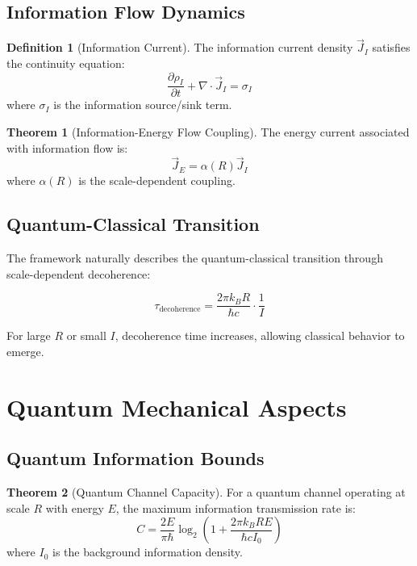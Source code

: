 \documentclass[11pt,a4paper]{article}
\theoremstyle{definition}
\newtheorem{definition}{Definition}[section]
\newtheorem{theorem}{Theorem}[section]
\begin{document}
\subsection{Information Flow Dynamics}

\begin{definition}[Information Current]
The information current density $\vec{J}_I$ satisfies the continuity equation:
\begin{equation}
\frac{\partial \rho_I}{\partial t} + \nabla \cdot \vec{J}_I = \sigma_I
\end{equation}
where $\sigma_I$ is the information source/sink term.
\end{definition}

\begin{theorem}[Information-Energy Flow Coupling]
The energy current associated with information flow is:
\begin{equation}
\vec{J}_E = \alpha(R) \vec{J}_I
\end{equation}
where $\alpha(R)$ is the scale-dependent coupling.
\end{theorem}

\subsection{Quantum-Classical Transition}

The framework naturally describes the quantum-classical transition through scale-dependent decoherence:

\begin{equation}
\tau_{\text{decoherence}} = \frac{2\pi k_B R}{\hbar c} \cdot \frac{1}{I}
\end{equation}

For large $R$ or small $I$, decoherence time increases, allowing classical behavior to emerge.

\section{Quantum Mechanical Aspects}

\subsection{Quantum Information Bounds}

\begin{theorem}[Quantum Channel Capacity]
For a quantum channel operating at scale $R$ with energy $E$, the maximum information transmission rate is:
\begin{equation}
C = \frac{2E}{\pi \hbar} \log_2\left(1 + \frac{2\pi k_B R E}{\hbar c I_0}\right)
\end{equation}
where $I_0$ is the background information density.
\end{theorem}
\end{document}
